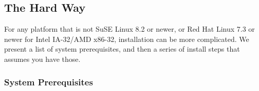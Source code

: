 \newcommand{\gccURL}{ftp://ftp.gnu.org/gnu/gcc}
\newcommand{\glibcURL}{ftp://ftp.gnu.org/gnu/glibc}
\newcommand{\makeURL}{ftp://ftp.gnu.org/gnu/make}
\newcommand{\bashURL}{ftp://ftp.gnu.org/gnu/bash}
\newcommand{\bisonURL}{ftp://ftp.gnu.org/gnu/bison}
\newcommand{\tarURL}{ftp://ftp.gnu.org/gnu/tar}
\newcommand{\autoconfURL}{ftp://ftp.gnu.org/gnu/autoconf}
\newcommand{\automakeURL}{ftp://ftp.gnu.org/gnu/automake}
\newcommand{\wgetURL}{ftp://ftp.gnu.org/gnu/wget}
\newcommand{\cvsURL}{http://www.cvshome.org}
\newcommand{\linuxPPCJDKURL}{http://www.ibm.com/java/jdk/linux/index.html}
\newcommand{\linuxKernelURL}{http://www.kernel.org}

\subsection{The Hard Way}

 For any platform that is not SuSE\Rweb{} Linux\Rweb{} 8.2 or newer, or Red Hat\TMweb{} Linux 7.3 or newer for Intel\Rweb{}
IA-32/AMD\Rweb{} x86-32, installation can be more complicated.  We present a list of system
prerequisites, and then a series of install steps that assumes you
have those.

\subsubsection{System Prerequisites}

